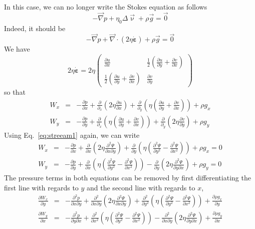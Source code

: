 In this case, we can no longer write the Stokes equation as follows
\begin{equation}
-{\vec \nabla}p + \eta_0 \Delta {\vec \upnu} + \rho {\vec g} = \vec{0}
\end{equation}
Indeed, it should be 
\begin{equation}
-{\vec \nabla}p + \vec\nabla \cdot (2 \eta \dot{\bm \varepsilon}) + \rho {\vec g} = \vec{0}
\end{equation}
We have
\[
2 \eta \dot{\bm \varepsilon}
= 2 \eta 
\left(
\begin{array}{cc}
\frac{\partial u}{\partial x} & \frac12 (\frac{\partial u}{\partial y}+\frac{\partial v}{\partial x}) \\
\frac12 (\frac{\partial u}{\partial y}+\frac{\partial v}{\partial x}) & \frac{\partial v}{\partial y} 
\end{array}
\right)
\]
so that 
\begin{eqnarray}
W_x&=&-\frac{\partial p}{\partial x} 
+ \frac{\partial }{\partial_x} \left(2\eta \frac{\partial u}{\partial x} \right)
+ \frac{\partial }{\partial_y} \left( \eta (\frac{\partial u}{\partial y}+\frac{\partial v}{\partial x}) \right)
+ \rho g_x\\
W_y&=&-\frac{\partial p}{\partial y} 
+ \frac{\partial }{\partial_x} \left( \eta (\frac{\partial u}{\partial y}+\frac{\partial v}
{\partial x}) \right) 
+ \frac{\partial }{\partial_y} \left(2\eta \frac{\partial v}{\partial y} \right)
+ \rho g_y
\end{eqnarray}
Using Eq.~\eqref{eq:streeam1} again, we can write 
\begin{eqnarray}
W_x&=&-\frac{\partial p}{\partial x} 
+ \frac{\partial }{\partial x} \left(2\eta \frac{\partial^2 \Psi}{\partial x \partial y} \right)
+ \frac{\partial }{\partial y} \left( \eta (\frac{\partial^2 \Psi}{\partial y^2}-\frac{\partial^2 \Psi}{\partial x^2}) \right)
+ \rho g_x = 0\\
W_y&=&-\frac{\partial p}{\partial y} 
+ \frac{\partial }{\partial x} \left( \eta (\frac{\partial^2 \Psi}{\partial y^2}-\frac{\partial^2 \Psi}{\partial x^2}) \right) 
- \frac{\partial }{\partial y} \left(2\eta \frac{\partial^2 \Psi}{\partial y \partial x} \right)
+ \rho g_y = 0
\end{eqnarray}
The pressure terms in both equations can be removed by first differentiating
the first line with regards to $y$ and the second line with regards to $x$, 
\begin{eqnarray}
\frac{\partial W_x}{\partial y}&=&-\frac{\partial^2 p}{\partial x \partial y} 
+ \frac{\partial^2 }{\partial x \partial y} \left(2\eta \frac{\partial^2 \Psi}{\partial x \partial y} \right)
+ \frac{\partial^2 }{\partial y^2} \left( \eta (\frac{\partial^2 \Psi}{\partial y^2}-\frac{\partial^2 \Psi}{\partial x^2}) \right)
+ \frac{\partial \rho g_x}{\partial y}
\\
\frac{\partial W_y}{\partial x}&=&-\frac{\partial^2 p}{\partial y \partial x} 
+ \frac{\partial^2 }{\partial x^2} \left( \eta (\frac{\partial^2 \Psi}{\partial y^2}-\frac{\partial^2 \Psi}{\partial x^2}) \right) 
- \frac{\partial^2 }{\partial x\partial y} \left(2\eta \frac{\partial^2 \Psi}{\partial y \partial x} \right)
+ \frac{\partial \rho g_y}{\partial x}
\end{eqnarray}

